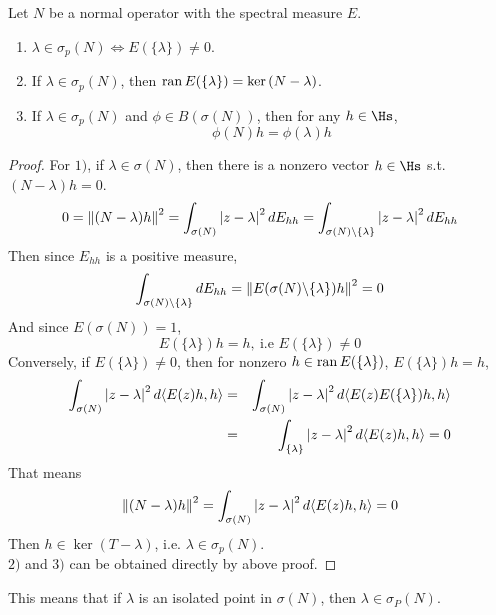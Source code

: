 \begin{prop}
	Let $N$ be a normal operator with the spectral measure $E$.
	\begin{enumerate}[label=\arabic*)]
		\item $\lambda \in \sigma_p(N) \Leftrightarrow E(\{\lambda\}) \neq 0$.
		\item If $\lambda \in \sigma_p(N)$, then $\operatorname{ran}{E(\{\lambda\})}=\ker{(N-\lambda)}$.
		\item If $\lambda \in \sigma_p(N)$ and $\phi \in B(\sigma(N))$, then for any $h \in \Hs$,
		\begin{equation*}
			\phi(N)h = \phi(\lambda)h
		\end{equation*}
	\end{enumerate}
\end{prop}
\begin{proof}
	For $1)$, if $\lambda \in \sigma(N)$, then there is a nonzero vector $h \in \Hs$ s.t. $(N-\lambda)h=0$.
	\begin{equation*}
		0 = \left\lVert(N-\lambda)h\right\lVert^2=\int_{\sigma(N)} \left\lvert z-\lambda\right\lvert^2 d E_{hh} = \int_{\sigma(N) \backslash \{\lambda\}} \left\lvert z-\lambda\right\lvert^2 d E_{hh}
	\end{equation*}
	Then since $E_{hh}$ is a positive measure,
	\begin{equation*}
		\int_{\sigma(N) \backslash \{\lambda\}} d E_{hh} = \left\lVert E(\sigma(N) \backslash \{\lambda\})h\right\lVert^2 = 0
	\end{equation*} 
	And since $E(\sigma(N))=1$, 
	\begin{equation*}
		E(\{\lambda\})h = h,~\text{i.e } E(\{\lambda\}) \neq 0
	\end{equation*}
	Conversely, if $E(\{\lambda\}) \neq 0$, then for nonzero $h \in \operatorname{ran}{E(\{\lambda\})}$, $E(\{\lambda\})h = h$,
	\begin{eqnarray*}
		\int_{\sigma(N)} \left\lvert z-\lambda\right\lvert^2 d \langle E(z)h,h \rangle &=&  \int_{\sigma(N)} \left\lvert z-\lambda\right\lvert^2 d \langle E(z)E(\{\lambda\})h,h \rangle \\
		&=& \int_{\{\lambda\}} \left\lvert z-\lambda\right\lvert^2 d \langle E(z)h,h \rangle =0
	\end{eqnarray*}
	That means
	\begin{equation*}
		\left\lVert(N-\lambda)h\right\lVert^2 = \int_{\sigma(N)} \left\lvert z-\lambda\right\lvert^2 d \langle E(z)h,h \rangle = 0
	\end{equation*}
	Then $h \in \ker{(T-\lambda)}$, i.e. $\lambda \in \sigma_p(N)$. \\
	$2)$ and $3)$ can be obtained directly by above proof.
\end{proof}
\begin{rem}
	This means that if $\lambda$ is an isolated point in $\sigma(N)$, then $\lambda \in \sigma_P(N)$.
\end{rem}

